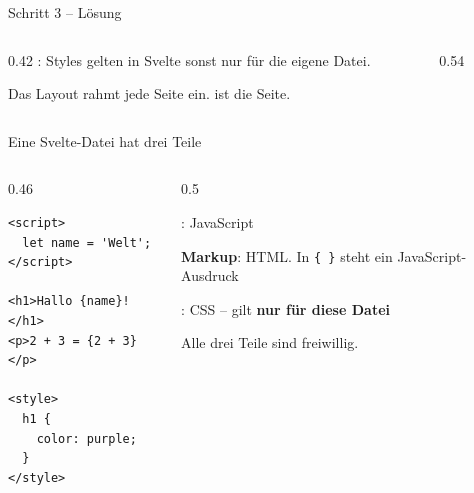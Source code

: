 \begin{loesung}
\begin{frame}[fragile]{Schritt 3 -- Lösung}
  \begin{columns}[onlytextwidth,t]
    \begin{column}{0.42\textwidth}
      \vspace{0.4em}
      \footnotesize {}: Styles gelten in Svelte sonst nur für die eigene Datei.

      \vspace{0.4em}
      Das Layout rahmt jede Seite ein.  ist die Seite.
    \end{column}
    \begin{column}{0.54\textwidth}
    \end{column}
  \end{columns}
\end{frame}
\end{loesung}


\begin{frame}[fragile]{Eine Svelte-Datei hat drei Teile}
  \begin{columns}[onlytextwidth,t]
    \begin{column}{0.46\textwidth}
\begin{lstlisting}[style=svelte]
<script>
  let name = 'Welt';
</script>

<h1>Hallo {name}!</h1>
<p>2 + 3 = {2 + 3}</p>

<style>
  h1 {
    color: purple;
  }
</style>
\end{lstlisting}
    \end{column}
    \begin{column}{0.5\textwidth}
      \small
      \begin{tugitemize}
        \item[1--3] \textbf{}: JavaScript
        \item[5--6] \textbf{Markup}: HTML. In \texttt{\{ \}} steht ein
              JavaScript-Ausdruck
        \item[8--12] \textbf{}: CSS -- gilt \textbf{nur für diese Datei}
      \end{tugitemize}
      \vspace{0.5em}
      Alle drei Teile sind freiwillig.
    \end{column}
  \end{columns}
\end{frame}

